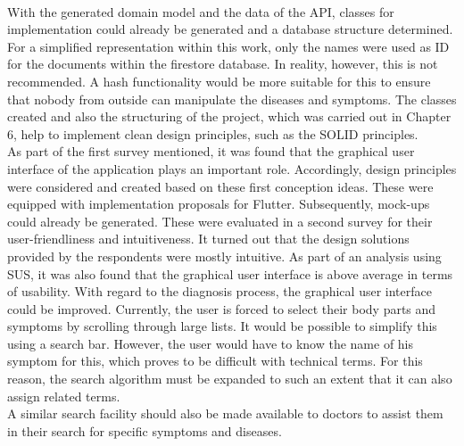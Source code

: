 \newline \\
With the generated domain model and the data of the API, classes for implementation could already be generated and a database structure determined. For a simplified representation within this work, only the names were used as ID for the documents within the firestore database. In reality, however, this is not recommended. A hash functionality would be more suitable for this to ensure that nobody from outside can manipulate the diseases and symptoms. The classes created and also the structuring of the project, which was carried out in Chapter 6, help to implement clean design principles, such as the SOLID principles.
\newline \\
As part of the first survey mentioned, it was found that the graphical user interface of the application plays an important role. Accordingly, design principles were considered and created based on these first conception ideas. These were equipped with implementation proposals for Flutter. Subsequently, mock-ups could already be generated. These were evaluated in a second survey for their user-friendliness and intuitiveness. It turned out that the design solutions provided by the respondents were mostly intuitive. As part of an analysis using SUS, it was also found that the graphical user interface is above average in terms of usability. With regard to the diagnosis process, the graphical user interface could be improved. Currently, the user is forced to select their body parts and symptoms by scrolling through large lists. It would be possible to simplify this using a search bar. However, the user would have to know the name of his symptom for this, which proves to be difficult with technical terms. For this reason, the search algorithm must be expanded to such an extent that it can also assign related terms.
\newline \\
A similar search facility should also be made available to doctors to assist them in their search for specific symptoms and diseases.
\newline \\
